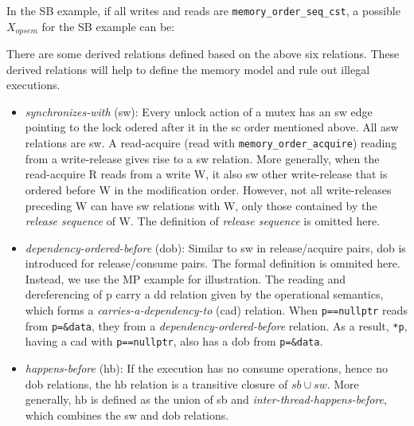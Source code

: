 In the SB example, if all writes and reads are \texttt{memory\_order\_seq\_cst}, a possible $X_{opsem}$ for the SB example can be:

There are some derived relations defined based on the above six relations. These derived relations will help to define the memory model and rule out illegal executions.

\begin{itemize}
    \item \textit{synchronizes-with} (sw): Every unlock action of a mutex has an sw edge pointing to the lock odered after it in the sc order mentioned above. All asw relations are sw. A read-acquire (read with \texttt{memory\_order\_acquire}) reading from a write-release gives rise to a sw relation. More generally, when the read-acquire R reads from a write W, it also sw other write-release that is ordered before W in the modification order. However, not all write-releases preceding W can have sw relations with W, only those contained by the \textit{release sequence} of W. The definition of \textit{release sequence} is omitted here. 
    \item \textit{dependency-ordered-before} (dob): Similar to sw in release/acquire pairs, dob is introduced for release/consume pairs. The formal definition is ommited here. Instead, we use the MP example for illustration. The reading and dereferencing of p carry a dd relation given by the operational semantics, which forms a \textit{carries-a-dependency-to} (cad) relation. When \texttt{p==nullptr} reads from \texttt{p=\&data}, they from a \textit{dependency-ordered-before} relation. As a result, \texttt{*p}, having a cad with \texttt{p==nullptr}, also has a dob from \texttt{p=\&data}. 
    \item \textit{happens-before} (hb): If the execution has no consume operations, hence no dob relations, the hb relation is a transitive closure of $sb \cup sw$. More generally, hb is defined as the union of sb and \textit{inter-thread-happens-before}, which combines the sw and dob relations.
\end{itemize}
